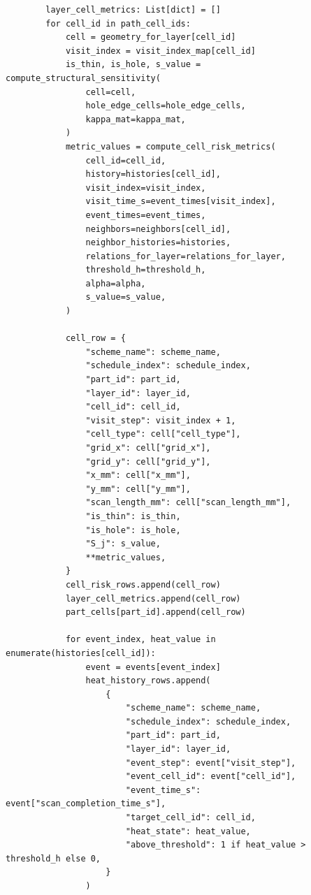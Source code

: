\documentclass[a4paper, 12pt]{ctexart}
\begin{document}
\begin{verbatim}
        layer_cell_metrics: List[dict] = []
        for cell_id in path_cell_ids:
            cell = geometry_for_layer[cell_id]
            visit_index = visit_index_map[cell_id]
            is_thin, is_hole, s_value = compute_structural_sensitivity(
                cell=cell,
                hole_edge_cells=hole_edge_cells,
                kappa_mat=kappa_mat,
            )
            metric_values = compute_cell_risk_metrics(
                cell_id=cell_id,
                history=histories[cell_id],
                visit_index=visit_index,
                visit_time_s=event_times[visit_index],
                event_times=event_times,
                neighbors=neighbors[cell_id],
                neighbor_histories=histories,
                relations_for_layer=relations_for_layer,
                threshold_h=threshold_h,
                alpha=alpha,
                s_value=s_value,
            )

            cell_row = {
                "scheme_name": scheme_name,
                "schedule_index": schedule_index,
                "part_id": part_id,
                "layer_id": layer_id,
                "cell_id": cell_id,
                "visit_step": visit_index + 1,
                "cell_type": cell["cell_type"],
                "grid_x": cell["grid_x"],
                "grid_y": cell["grid_y"],
                "x_mm": cell["x_mm"],
                "y_mm": cell["y_mm"],
                "scan_length_mm": cell["scan_length_mm"],
                "is_thin": is_thin,
                "is_hole": is_hole,
                "S_j": s_value,
                **metric_values,
            }
            cell_risk_rows.append(cell_row)
            layer_cell_metrics.append(cell_row)
            part_cells[part_id].append(cell_row)

            for event_index, heat_value in enumerate(histories[cell_id]):
                event = events[event_index]
                heat_history_rows.append(
                    {
                        "scheme_name": scheme_name,
                        "schedule_index": schedule_index,
                        "part_id": part_id,
                        "layer_id": layer_id,
                        "event_step": event["visit_step"],
                        "event_cell_id": event["cell_id"],
                        "event_time_s": event["scan_completion_time_s"],
                        "target_cell_id": cell_id,
                        "heat_state": heat_value,
                        "above_threshold": 1 if heat_value > threshold_h else 0,
                    }
                )


\end{verbatim}
\end{document}
